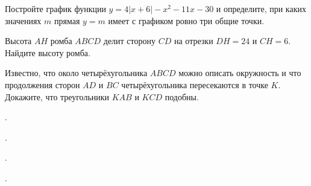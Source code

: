 \begin{class}[number=5]
\begin{listofex}
		\item Постройте график функции \( y=4|x+6|-x^2-11x-30 \) и определите, при каких значениях \( m \)	прямая \( y=m \) имеет с графиком ровно три общие точки.
		\item Высота \( AH \) ромба \( ABCD \) делит сторону \( CD \) на отрезки \( DH=24 \) и \( CH=6 \). Найдите высоту ромба.
		\item Известно, что около четырёхугольника \( ABCD \) можно описать окружность и что продолжения сторон \( AD \) и \( BC \) четырёхугольника пересекаются в точке \( K \). Докажите, что треугольники \( KAB \) и \( KCD \) подобны.
	\end{listofex}
\end{class}

\begin{class}[number=6]
	\begin{listofex}
		\item .
	\end{listofex}
\end{class}

\begin{homework}[number=3]
	\begin{listofex}
		\item .
	\end{listofex}
\end{homework}

\begin{class}[number=7]
	\begin{listofex}
		\item .
	\end{listofex}
\end{class}

\begin{class}[number=8]
	\begin{listofex}
		\item .
	\end{listofex}
\end{class}
